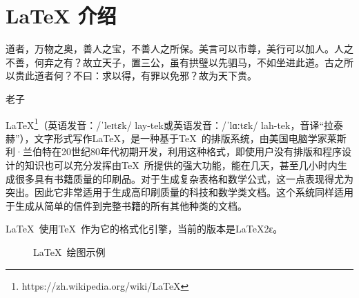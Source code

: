 \chapter{\LaTeX{} 介绍}
\epigraph{道者，万物之奥，善人之宝，不善人之所保。美言可以市尊，美行可以加人。人之不善，何弃之有？故立天子，置三公，虽有拱璧以先驷马，不如坐进此道。古之所以贵此道者何？不曰：求以得，有罪以免邪？故为天下贵。}{老子}

\LaTeX\footnote{https://zh.wikipedia.org/wiki/LaTeX}（英语发音：/ˈleɪtɛk/ lay-tek或英语发音：/ˈlɑːtɛk/ lah-tek，音译“拉泰赫”），文字形式写作\LaTeX ，是一种基于\TeX\ 的排版系统，由美国电脑学家莱斯利·兰伯特在20世纪80年代初期开发，利用这种格式，即使用户没有排版和程序设计的知识也可以充分发挥由\TeX\ 所提供的强大功能，能在几天，甚至几小时内生成很多具有书籍质量的印刷品。对于生成复杂表格和数学公式，这一点表现得尤为突出。因此它非常适用于生成高印刷质量的科技和数学类文档。这个系统同样适用于生成从简单的信件到完整书籍的所有其他种类的文档。

\LaTeX\ 使用\TeX\ 作为它的格式化引擎，当前的版本是\LaTeX 2ε。
\begin{figure}[htbp]
    \centering
\caption{\LaTeX\ 绘图示例}
    \label{fig:mini:subfig} %
\end{figure}

